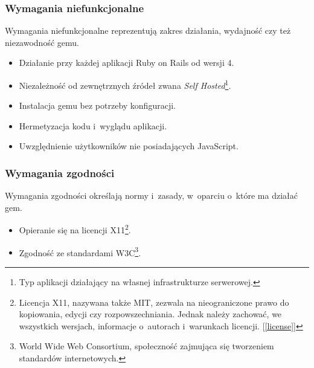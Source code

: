 \begin{itemize}
\end{itemize}

\subsubsection{Wymagania niefunkcjonalne}
Wymagania niefunkcjonalne reprezentują zakres działania, wydajność czy też niezawodność gemu.
\begin{itemize}
  \item Działanie przy każdej aplikacji Ruby on Rails od wersji 4.
  \item Niezależność od zewnętrznych źródeł zwana \emph{Self Hosted}\footnote{Typ aplikacji działający na własnej infrastrukturze serwerowej.}.
  \item Instalacja gemu bez potrzeby konfiguracji.
  \item Hermetyzacja kodu i~wyglądu aplikacji.
  \item Uwzględnienie użytkowników nie posiadających JavaScript.

\end{itemize}

\subsubsection{Wymagania zgodności}
Wymagania zgodności określają normy i~zasady, w~oparciu o~które ma działać gem.
\begin{itemize}
  \item Opieranie się na licencji X11\footnote{Licencja X11, nazywana także MIT, zezwala na nieograniczone prawo do kopiowania, edycji czy rozpowszechniania. Jednak należy zachować, we wszystkich wersjach, informacje o~autorach i~warunkach licencji. [\ref{license}]}.
  \item Zgodność ze standardami W3C\footnote{World Wide Web Consortium, społeczność zajmująca się tworzeniem standardów internetowych.}.
\end{itemize}
